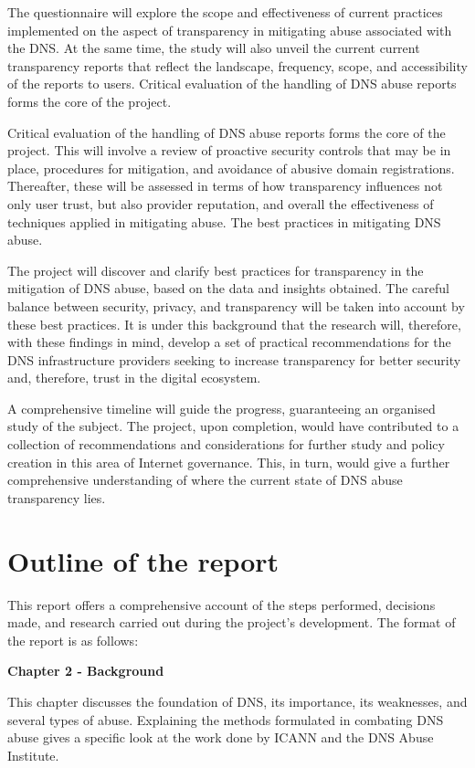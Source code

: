 The questionnaire will explore the scope and effectiveness of current practices implemented on the aspect of transparency in mitigating abuse associated with the DNS. At the same time, the study will also unveil the current current transparency reports that reflect the landscape, frequency, scope, and accessibility of the reports to users. Critical evaluation of the handling of DNS abuse reports forms the core of the project.

Critical evaluation of the handling of DNS abuse reports forms the core of the project. This will involve a review of proactive security controls that may be in place, procedures for mitigation, and avoidance of abusive domain registrations. Thereafter, these will be assessed in terms of how transparency influences not only user trust, but also provider reputation, and overall the effectiveness of techniques applied in mitigating abuse. The best practices in mitigating DNS abuse.

The project will discover and clarify best practices for transparency in the mitigation of DNS abuse, based on the data and insights obtained. The careful balance between security, privacy, and transparency will be taken into account by these best practices. It is under this background that the research will, therefore, with these findings in mind, develop a set of practical recommendations for the DNS infrastructure providers seeking to increase transparency for better security and, therefore, trust in the digital ecosystem.

A comprehensive timeline will guide the progress, guaranteeing an organised study of the subject. The project, upon completion, would have contributed to a collection of recommendations and considerations for further study and policy creation in this area of Internet governance. This, in turn, would give a further comprehensive understanding of where the current state of DNS abuse transparency lies.

\section{Outline of the report}

This report offers a comprehensive account of the steps performed, decisions made, and research carried out during the project's development. The format of the report is as follows:

\textbf{Chapter 2 - Background }

This chapter discusses the foundation of DNS, its importance, its weaknesses, and several types of abuse. Explaining the methods formulated in combating DNS abuse gives a specific look at the work done by ICANN and the DNS Abuse Institute.

